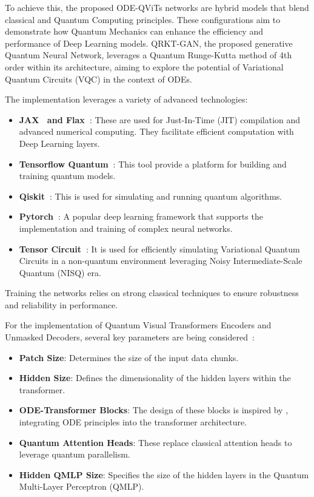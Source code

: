 \documentclass[12pt,a4paper]{report}
\begin{document}
To achieve this, the proposed ODE-QViTs networks are hybrid models that blend classical and Quantum Computing principles. These configurations aim to demonstrate how Quantum Mechanics can enhance the efficiency and performance of Deep Learning models. QRKT-GAN, the proposed generative Quantum Neural Network, leverages a Quantum Runge-Kutta method of 4th order within its architecture, aiming to explore the potential of Variational Quantum Circuits (VQC) in the context of ODEs.

The implementation leverages a variety of advanced technologies:

\begin{itemize}
  \item \textbf{JAX~\cite{bradbury2018jax} and Flax~\cite{heek2020flax}}: These are used for Just-In-Time (JIT) compilation and advanced numerical computing. They facilitate efficient computation with Deep Learning layers.
  \item \textbf{Tensorflow Quantum~\cite{broughton2020tensorflow}}: This tool provide a platform for building and training quantum models.
  \item \textbf{Qiskit~\cite{cross2018ibm}}: This is used for simulating and running quantum algorithms.
  \item \textbf{Pytorch~\cite{imambi2021pytorch}}: A popular deep learning framework that supports the implementation and training of complex neural networks.
  \item \textbf{Tensor Circuit~\cite{Zhang_2023}}: It is used for efficiently simulating Variational Quantum Circuits in a non-quantum environment leveraging Noisy Intermediate-Scale Quantum (NISQ) era.
\end{itemize}

Training the networks relies on strong classical techniques to ensure robustness and reliability in performance.

For the implementation of Quantum Visual Transformers Encoders and Unmasked Decoders, several key parameters are being considered~\cite{Comajoan_Cara_2024}:

\begin{itemize}
  \item \textbf{Patch Size}: Determines the size of the input data chunks.
  \item \textbf{Hidden Size}: Defines the dimensionality of the hidden layers within the transformer.
  \item \textbf{ODE-Transformer Blocks}: The design of these blocks is inspired by \cite{li2022ode}, integrating ODE principles into the transformer architecture.
  \item \textbf{Quantum Attention Heads}: These replace classical attention heads to leverage quantum parallelism.
  \item \textbf{Hidden QMLP Size}: Specifies the size of the hidden layers in the Quantum Multi-Layer Perceptron (QMLP).
\end{itemize}
\end{document}
